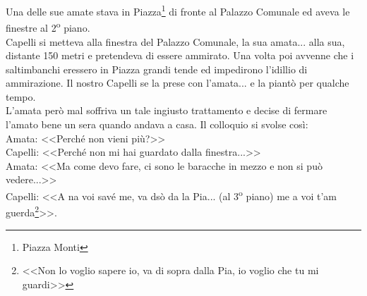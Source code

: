 \indent Una delle sue amate stava in Piazza\footnote{Piazza Monti} di fronte al Palazzo Comunale ed aveva le finestre al 2\textsuperscript{o} piano.\\
\indent {}Capelli si metteva alla finestra del Palazzo Comunale, la sua amata... alla sua, distante 150 metri e pretendeva di essere ammirato. Una volta poi avvenne che i saltimbanchi eressero in Piazza grandi tende ed impedirono l'idillio di ammirazione. Il nostro Capelli se la prese con l'amata... e la piantò per qualche tempo.\\
\indent L'amata però mal soffriva un tale ingiusto trattamento e decise di fermare l'amato bene un sera quando andava a casa. Il colloquio si svolse così:\\
\indent Amata: <<Perché non vieni più?>>\\
\indent Capelli: <<Perché non mi hai guardato dalla finestra...>>\\
\indent Amata: <<Ma come devo fare, ci sono le baracche in mezzo e non si può vedere...>>\\
\indent Capelli: <<A na voi savé me, va dsò da la Pia... (al 3\textsuperscript{o} piano) me a voi t'am guerda\footnote{<<Non lo voglio sapere io, va di sopra dalla Pia, io voglio che tu mi guardi>>}>>.\\


